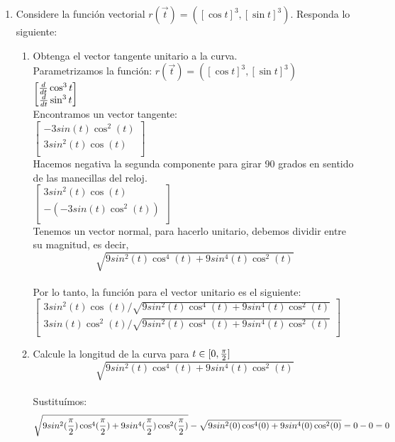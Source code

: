 \documentclass[10pt,letterpaper,fleqn]{article}
\begin{document}
\begin{enumerate}
        \item Considere la función vectorial $r(\overrightarrow{t})= ([\cos t]^3,[\sin t]^3)$. Responda lo siguiente:
        \begin{enumerate}
            \item Obtenga el vector tangente unitario a la curva. \\
            Parametrizamos la función:
            $r(\overrightarrow{t})= ([\cos t]^3,[\sin t]^3)$ \\
            $\begin{bmatrix}
            {d \over dt} \cos^3 t \\
            {d \over dt} \sin^3 t \\
            \end{bmatrix}$ \\
            Encontramos un vector tangente: \\
            $\begin{bmatrix}
            -3sin(t)\cos^2(t) \\
            3sin^2(t)\cos(t) \\
            \end{bmatrix}$ \\
            Hacemos negativa la segunda componente para girar 90 grados en sentido de las manecillas del reloj. \\
            $\begin{bmatrix}
            3sin^2(t)\cos(t) \\
            -(-3sin(t)\cos^2(t))\\
            \end{bmatrix}$ \\
            Tenemos un vector normal, para hacerlo unitario, debemos dividir entre su magnitud, es decir, \\
            $$\sqrt{9sin^2(t)\cos^4(t)+9sin^4(t)\cos^2(t)}$$ \\
            Por lo tanto, la función para el vector unitario es el siguiente: \\
            $\begin{bmatrix}
            3sin^2(t)\cos(t) / \sqrt{9sin^2(t)\cos^4(t)+9sin^4(t)\cos^2(t)} \\
            3sin(t)\cos^2(t) / \sqrt{9sin^2(t)\cos^4(t)+9sin^4(t)\cos^2(t)}\\
            \end{bmatrix}$ \\
            \item Calcule la longitud de la curva para $t \in [0,{\pi \over 2}]$ \\
            $$\sqrt{9sin^2(t)\cos^4(t)+9sin^4(t)\cos^2(t)}$$ \\
            Sustituímos: \\
            $$\sqrt{9sin^2({\pi \over 2})\cos^4({\pi \over 2})+9sin^4({\pi \over 2})\cos^2({\pi \over 2})} - \sqrt{9sin^2(0)\cos^4(0)+9sin^4(0)\cos^2(0)} = 0 - 0 = 0 $$
        \end{enumerate}


\end{enumerate}
\end{document}
